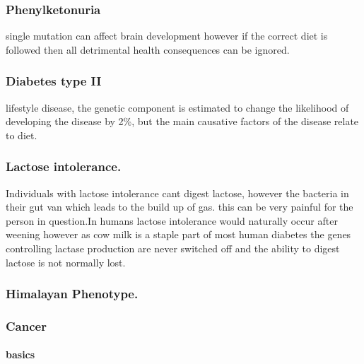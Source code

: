 \documentclass[]{article}
\let\oldparagraph\paragraph
\renewcommand{\paragraph}[1]{\oldparagraph{#1}\mbox{}}
\begin{document}
\hypertarget{phenylketonuria-1}{%
\subsubsection{Phenylketonuria}\label{phenylketonuria-1}}

single mutation can affect brain development however if the correct diet
is followed then all detrimental health consequences can be ignored.

\hypertarget{diabetes-type-ii-1}{%
\subsubsection{Diabetes type II}\label{diabetes-type-ii-1}}

lifestyle disease, the genetic component is estimated to change the
likelihood of developing the disease by 2\%, but the main causative
factors of the disease relate to diet.

\hypertarget{lactose-intolerance.-1}{%
\subsubsection{Lactose intolerance.}\label{lactose-intolerance.-1}}

Individuals with lactose intolerance cant digest lactose, however the
bacteria in their gut van which leads to the build up of gas. this can
be very painful for the person in question.In humans lactose intolerance
would naturally occur after weening however as cow milk is a staple part
of most human diabetes the genes controlling lactase production are
never switched off and the ability to digest lactose is not normally
lost.

\hypertarget{himalayan-phenotype.-1}{%
\subsubsection{Himalayan Phenotype.}\label{himalayan-phenotype.-1}}

\hypertarget{cancer-1}{%
\subsubsection{Cancer}\label{cancer-1}}

\hypertarget{basics-1}{%
\paragraph{basics}\label{basics-1}}
\end{document}
